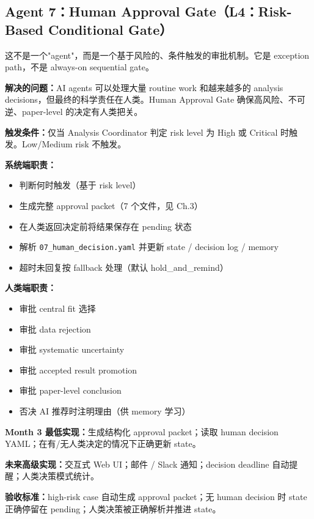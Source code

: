 \documentclass[11pt,a4paper,fontset=fandol]{ctexart}
\begin{document}
\subsection{Agent 7：Human Approval Gate（L4：Risk-Based Conditional Gate）}

\begin{tcolorbox}[colback=gray!5,colframe=gray!50,title=本质]
这不是一个"agent"，而是一个基于风险的、条件触发的审批机制。它是 exception path，不是 always-on sequential gate。
\end{tcolorbox}

\textbf{解决的问题：}AI agents 可以处理大量 routine work 和越来越多的 analysis decisions，但最终的科学责任在人类。Human Approval Gate 确保高风险、不可逆、paper-level 的决定有人类把关。

\textbf{触发条件：}仅当 Analysis Coordinator 判定 risk level 为 High 或 Critical 时触发。Low/Medium risk 不触发。

\textbf{系统端职责：}
\begin{itemize}
  \item 判断何时触发（基于 risk level）
  \item 生成完整 approval packet（7 个文件，见 Ch.3）
  \item 在人类返回决定前将结果保存在 pending 状态
  \item 解析 \texttt{07\_human\_decision.yaml} 并更新 state / decision log / memory
  \item 超时未回复按 fallback 处理（默认 hold\_and\_remind）
\end{itemize}

\textbf{人类端职责：}
\begin{itemize}
  \item 审批 central fit 选择
  \item 审批 data rejection
  \item 审批 systematic uncertainty
  \item 审批 accepted result promotion
  \item 审批 paper-level conclusion
  \item 否决 AI 推荐时注明理由（供 memory 学习）
\end{itemize}

\textbf{Month 3 最低实现：}生成结构化 approval packet；读取 human decision YAML；在有/无人类决定的情况下正确更新 state。

\textbf{未来高级实现：}交互式 Web UI；邮件 / Slack 通知；decision deadline 自动提醒；人类决策模式统计。

\textbf{验收标准：}high-risk case 自动生成 approval packet；无 human decision 时 state 正确停留在 pending；人类决策被正确解析并推进 state。
\end{document}
